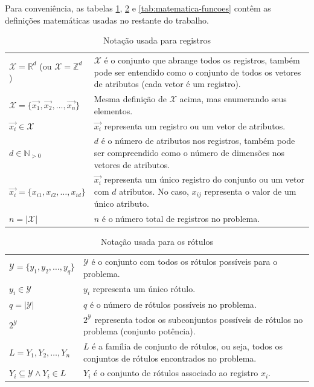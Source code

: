 \documentclass[runningheads,a4paper]{llncs}
\begin{document}
Para conveniência, as tabelas \ref{tab:matematica-registros}, \ref{tab:matematica-rotulos} e \ref{tab:matematica-funcoes} contêm as definições matemáticas usadas no restante do trabalho.

\begin{table}
	\centering
	\begin{tabular}{| >{\centering\arraybackslash}p{4cm} | m{8cm} |}
		\hline
		\multicolumn{2}{|c|}{\textit{Registros ou vetores de atributos}} \\
		\hline
		$\mathcal{X} = \mathbb{R}^d$ (ou $\mathcal{X} = \mathbb{Z}^d$) & $\mathcal{X}$ é o conjunto que abrange todos os registros, também pode ser entendido como o conjunto de todos os vetores de atributos (cada vetor é um registro). \\
		\hline
		$\mathcal{X} = \{\vec{x_1}, \vec{x_2}, \dots, \vec{x_n}\}$ & Mesma definição de $\mathcal{X}$ acima, mas enumerando seus elementos. \\
		\hline
		$\vec{x_i} \in \mathcal{X}$ & $\vec{x_i}$ representa um registro ou um vetor de atributos. \\
		\hline
		$d \in \mathbb{N}_{>0}$ & $d$ é o número de atributos nos registros, também pode ser compreendido como o número de dimensões nos vetores de atributos. \\
		\hline
		$\vec{x_i} = \{x_{i1}, x_{i2}, \dots, x_{id}\}$ & $\vec{x_i}$ representa um único registro do conjunto ou um vetor com $d$ atributos. No caso, $x_{ij}$ representa o valor de um único atributo. \\
		\hline
		$n = |\mathcal{X}|$ & $n$ é o número total de registros no problema. \\
		\hline
	\end{tabular}
	\caption{Notação usada para registros}
	\label{tab:matematica-registros}
\end{table}

\begin{table}
	\centering
	\begin{tabular}{| >{\centering\arraybackslash}p{4cm} | m{8cm} |}
		\hline	
		\multicolumn{2}{|c|}{\textit{Rótulos e conjuntos de rótulos}} \\
		\hline
		$\mathcal{Y} = \{y_1, y_2, \dots, y_q\}$ & $\mathcal{Y}$ é o conjunto com todos os rótulos possíveis para o problema. \\
		\hline
		$y_i \in \mathcal{Y}$ & $y_i$ representa um único rótulo. \\
		\hline
		$q = |\mathcal{Y}|$ & $q$ é o número de rótulos possíveis no problema. \\
		\hline
		$2^\mathcal{Y}$ & $2^\mathcal{Y}$ representa todos os subconjuntos possíveis de rótulos no problema (conjunto potência). \\
		\hline
		$L = {Y_1, Y_2, \dots, Y_n}$ & $L$ é a família de conjunto de rótulos, ou seja, todos os conjuntos de rótulos encontrados no problema.\\
		\hline
		$Y_i \subseteq \mathcal{Y} \wedge Y_i \in L$ & $Y_i$ é o conjunto de rótulos associado ao registro $x_i$. \\
		\hline
	\end{tabular}
	\caption{Notação usada para os rótulos}
	\label{tab:matematica-rotulos}
\end{table}
\end{document}
